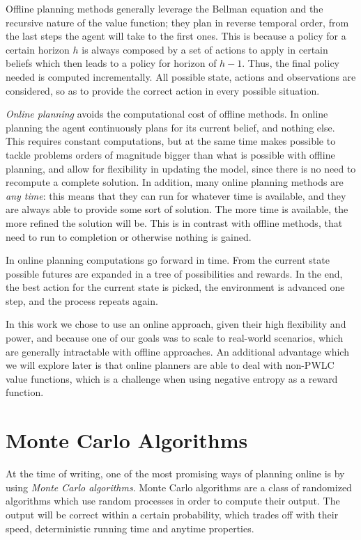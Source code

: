 Offline planning methods generally leverage the Bellman equation and the recursive nature of the
value function; they plan in reverse temporal order, from the last steps the agent will take to the
first ones. This is because a policy for a certain horizon $h$ is always composed by a set of
actions to apply in certain beliefs which then leads to a policy for horizon of $h-1$. Thus, the
final policy needed is computed incrementally. All possible state, actions and observations are
considered, so as to provide the correct action in every possible situation.

\textit{Online planning} avoids the computational cost of offline methods. In online planning the
agent continuously plans for its current belief, and nothing else. This requires constant
computations, but at the same time makes possible to tackle problems orders of magnitude bigger than
what is possible with offline planning, and allow for flexibility in updating the model, since there
is no need to recompute a complete solution. In addition, many online planning methods are
\textit{any time}: this means that they can run for whatever time is available, and they are always
able to provide some sort of solution. The more time is available, the more refined the solution
will be. This is in contrast with offline methods, that need to run to completion or otherwise
nothing is gained.

In online planning computations go forward in time. From the current state possible futures are
expanded in a tree of possibilities and rewards. In the end, the best action for the current state
is picked, the environment is advanced one step, and the process repeats again.

In this work we chose to use an online approach, given their high flexibility and power, and because
one of our goals was to scale to real-world scenarios, which are generally intractable with offline
approaches. An additional advantage which we will explore later is that online planners are able to
deal with non-PWLC value functions, which is a challenge when using negative entropy as a reward
function.

\section{Monte Carlo Algorithms}

At the time of writing, one of the most promising ways of planning online is by using \textit{Monte
Carlo algorithms}. Monte Carlo algorithms are a class of randomized algorithms which use random
processes in order to compute their output. The output will be correct within a certain probability,
which trades off with their speed, deterministic running time and anytime properties.

